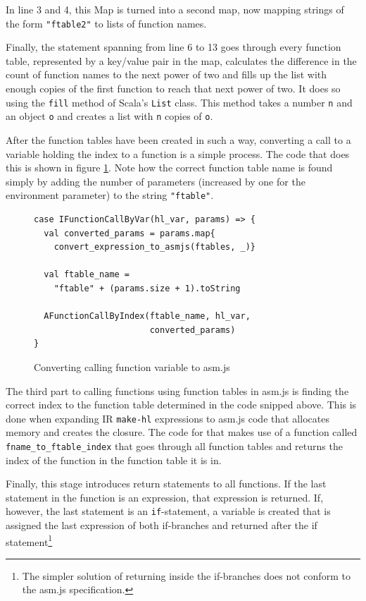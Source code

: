 \documentclass[11pt]{report}
\begin{document}
In line 3 and 4, this Map is turned into a second map, now mapping strings of the form \texttt{"ftable2"} to lists of function names.

Finally, the statement spanning from line 6 to 13 goes through every function table, represented by a key/value pair in the map, calculates the difference in the count of function names to the next power of two and fills up the list with enough copies of the first function to reach that next power of two. It does so using the \texttt{fill} method of Scala's \texttt{List} class. This method takes a number \texttt{n} and an object \texttt{o} and creates a list with \texttt{n} copies of \texttt{o}.

After the function tables have been created in such a way, converting a call to a variable holding the index to a function is a simple process. The code that does this is shown in figure \ref{iconvasmjs2}. Note how the correct function table name is found simply by adding the number of parameters (increased by one for the environment parameter) to the string \texttt{"ftable"}.

\begin{figure}[ht]
\begin{lstlisting}
case IFunctionCallByVar(hl_var, params) => {
  val converted_params = params.map{
    convert_expression_to_asmjs(ftables, _)}
    
  val ftable_name = 
    "ftable" + (params.size + 1).toString
    
  AFunctionCallByIndex(ftable_name, hl_var, 
                       converted_params)
}
\end{lstlisting}
\caption{Converting calling function variable to asm.js}
\label{iconvasmjs2}
\end{figure}

The third part to calling functions using function tables in asm.js is finding the correct index to the function table determined in the code snipped above. This is done when expanding IR \texttt{make-hl} expressions to asm.js code that allocates memory and creates the closure. The code for that makes use of a function called \texttt{fname_to_ftable_index} that goes through all function tables and returns the index of the function in the function table it is in.

Finally, this stage introduces return statements to all functions. If the last statement in the function is an expression, that expression is returned. If, however, the last statement is an \texttt{if}-statement, a variable is created that is assigned the last expression of both if-branches and returned after the if statement\footnote{The simpler solution of returning inside the if-branches does not conform to the asm.js specification.}
\end{document}
